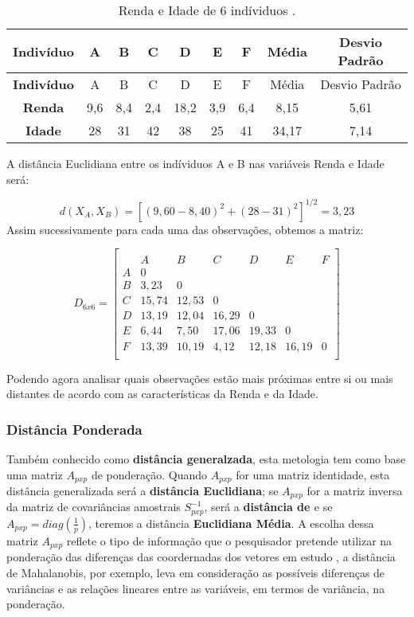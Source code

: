 \documentclass[
  openany]{book}
\begin{document}
\begin{longtable}[]{@{}ccccccccc@{}}
\caption{\label{tab:dadossrendaa} Renda e Idade de 6 indíviduos \citep{mingoti2007analise}.}\tabularnewline
\toprule
\textbf{Indivíduo} & A & B & C & D & E & F & Média & Desvio Padrão\tabularnewline
\midrule
\endfirsthead
\toprule
\textbf{Indivíduo} & A & B & C & D & E & F & Média & Desvio Padrão\tabularnewline
\midrule
\endhead
\textbf{Renda} & 9,6 & 8,4 & 2,4 & 18,2 & 3,9 & 6,4 & 8,15 & 5,61\tabularnewline
\textbf{Idade} & 28 & 31 & 42 & 38 & 25 & 41 & 34,17 & 7,14\tabularnewline
\bottomrule
\end{longtable}

A distância Euclidiana entre os indíviduos A e B nas variáveis Renda e Idade será:

\[d(X_A,X_B)=[(9,60-8,40)^2+(28-31)^2]^{1/2}=3,23\]
Assim sucessivamente para cada uma das observações, obtemos a matriz:

\[D_{6x6}=\begin{bmatrix}\\
 &A&B&C&D&E&F \\
 A&0&&&&&\\
 B&3,23&0&&&&\\
 C & 15,74& 12,53&0&&&\\
 D& 13,19& 12,04& 16,29&0&&\\
 E& 6,44& 7,50& 17,06& 19,33&0&\\
 F& 13,39& 10,19& 4,12& 12,18& 16,19&0 \\
\end{bmatrix}\]

Podendo agora analisar quais observações estão mais próximas entre si ou mais distantes de acordo com as características da Renda e da Idade.

\hypertarget{distponderada}{%
\subsubsection{Distância Ponderada}\label{distponderada}}

Também conhecido como \textbf{distância generalzada}, esta metologia tem como base uma matriz \(A_{pxp}\) de ponderação. Quando \(A_{pxp}\) for uma matriz identidade, esta distância generalizada será a \textbf{distância Euclidiana}; se \(A_{pxp}\) for a matriz inversa da matriz de covariâncias amostrais \(S^{-1}_{pxp}\), será a \textbf{distância de \citet{mahalanobis1936generalized}} e se \(A_{pxp}=diag(\frac{1}{p})\), teremos a distância \textbf{Euclidiana Média}. A escolha dessa matriz \(A_{pxp}\) reflete o tipo de informação que o pesquisador pretende utilizar na ponderação das diferenças das coordernadas dos vetores em estudo \citep{mingoti2007analise}, a distância de Mahalanobis, por exemplo, leva em consideração as possíveis diferenças de variâncias e as relações lineares entre as variáveis, em termos de variância, na ponderação.
\end{document}
